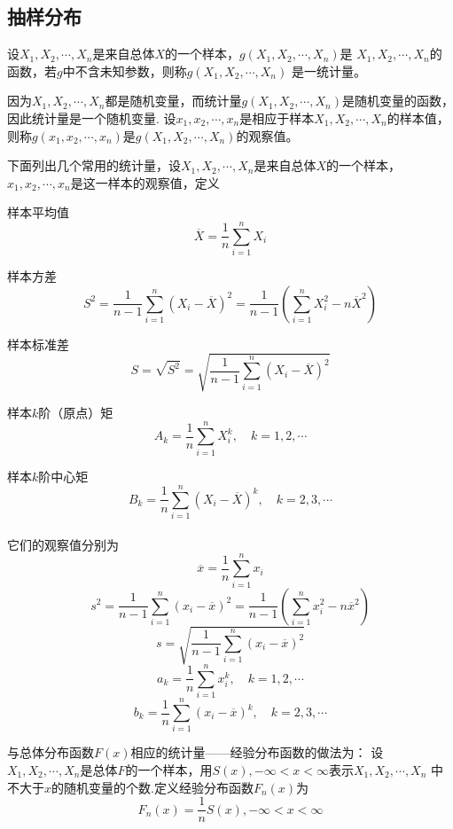 \subsection{抽样分布}
\begin{definition}
    \begin{definition}
        设$X_1,X_2,\cdots,X_n$是来自总体$X$的一个样本，$g(X_1,X_2,\cdots,X_n)$是
        $X_1,X_2,\cdots,X_n$的函数，若$g$中不含未知参数，则称$g(X_1,X_2,\cdots,X_n)$
        是一{\heiti 统计量}。

        因为$X_1,X_2,\cdots,X_n$都是随机变量，而统计量$g(X_1,X_2,\cdots,X_n)$是随机变量的函数，因此统计量是一个随机变量.
        设$x_1,x_2,\cdots,x_n$是相应于样本$X_1,X_2,\cdots,X_n$的样本值，则称$g(x_1,x_2,\cdots,x_n)$是$g(X_1,X_2,\cdots,X_n)$的观察值。

        下面列出几个常用的统计量，设$X_1,X_2,\cdots,X_n$是来自总体$X$的一个样本，$x_1,x_2,\cdots,x_n$是这一样本的观察值，定义

        {\heiti 样本平均值} $$\overline{X}=\frac{1}{n}\sum_{i=1}^nX_i$$

        {\heiti 样本方差}$$S^2=\frac{1}{n-1}\sum_{i=1}^n{(X_i-\overline{X})}^2=\frac{1}{n-1}(\sum_{i=1}^nX_i^2-n\overline{X}^2)$$

        {\heiti 样本标准差}$$S=\sqrt{S^2}=\sqrt{\frac{1}{n-1}\sum_{i=1}^n{(X_i-\overline{X})}^2}$$

        {\heiti 样本$k$阶（原点）矩}$$A_k=\frac{1}{n}\sum_{i=1}^nX_i^k,\quad k=1,2,\cdots$$

        {\heiti 样本$k$阶中心矩}$$B_k=\frac{1}{n}\sum_{i=1}^n{(X_i-\overline{X})}^k,\quad k=2,3,\cdots$$\\
        它们的观察值分别为
        $$\overline{x}=\frac{1}{n}\sum_{i=1}^nx_i$$
        $$s^2=\frac{1}{n-1}\sum_{i=1}^n{(x_i-\overline{x})}^2=\frac{1}{n-1}(\sum_{i=1}^nx_i^2-n\overline{x}^2)$$
        $$s=\sqrt{\frac{1}{n-1}\sum_{i=1}^n{(x_i-\overline{x})}^2}$$
        $$a_k=\frac{1}{n}\sum_{i=1}^nx_i^k,\quad k=1,2,\cdots$$
        $$b_k=\frac{1}{n}\sum_{i=1}^n{(x_i-\overline{x})}^k,\quad k=2,3,\cdots$$
    \end{definition}
\end{definition}

\begin{definition}[经验分布函数]
    与总体分布函数$F(x)$相应的统计量——经验分布函数的做法为：
    设$X_1,X_2,\cdots,X_n$是总体$F$的一个样本，用$S(x),-\infty<x<\infty$表示$X_1,X_2,\cdots,X_n$
    中不大于$x$的随机变量的个数.定义经验分布函数$F_n(x)$为
    $$F_n(x)=\frac{1}{n}S(x),-\infty<x<\infty$$
\end{definition}

